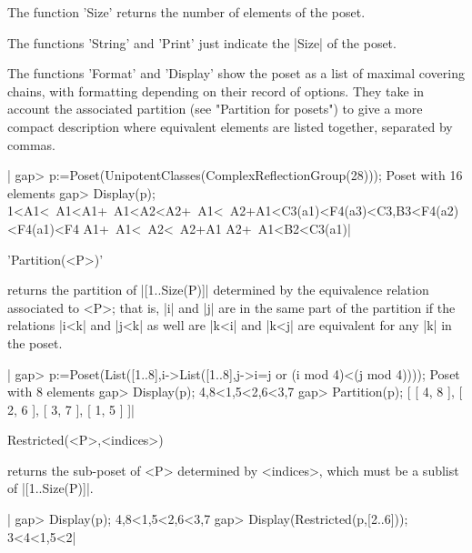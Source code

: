 %

The function 'Size' returns the number of elements of the poset.

The functions 'String' and 'Print' just indicate the |Size| of the poset.

The  functions 'Format' and 'Display'  show the poset as  a list of maximal
covering chains, with formatting depending on their record of options. They
take  in account the  associated partition (see  "Partition for posets") to
give  a  more  compact  description  where  equivalent  elements are listed
together, separated by commas.

|    gap> p:=Poset(UnipotentClasses(ComplexReflectionGroup(28)));
    Poset with 16 elements
    gap> Display(p);
    1<A1<~A1<A1+~A1<A2<A2+~A1<~A2+A1<C3(a1)<F4(a3)<C3,B3<F4(a2)<F4(a1)<F4
    A1+~A1<~A2<~A2+A1
    A2+~A1<B2<C3(a1)|

%
%

'Partition(<P>)'

returns  the  partition  of  |[1..Size(P)]|  determined  by the equivalence
relation  associated to <P>; that  is, |i| and |j|  are in the same part of
the  partition if the relations |i<k| and |j<k| as well are |k<i| and |k<j|
are equivalent for any |k| in the poset.

|    gap> p:=Poset(List([1..8],i->List([1..8],j->i=j or (i mod 4)<(j mod 4))));
    Poset with 8 elements
    gap> Display(p);
    4,8<1,5<2,6<3,7
    gap> Partition(p);
    [ [ 4, 8 ], [ 2, 6 ], [ 3, 7 ], [ 1, 5 ] ]|

%

Restricted(<P>,<indices>)

returns the sub-poset of <P> determined by <indices>, which must be a sublist
of |[1..Size(P)]|.

|    gap> Display(p);
    4,8<1,5<2,6<3,7
    gap> Display(Restricted(p,[2..6]));
    3<4<1,5<2|

